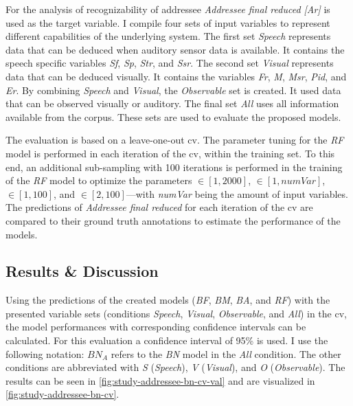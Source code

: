 For the analysis of recognizability of \gls{addressee} \emph{Addressee final reduced [Ar]} is used as the target variable.
I compile four sets of input variables to represent different capabilities of the underlying system.
The first set \emph{Speech} represents data that can be deduced when auditory sensor data is available.
It contains the speech specific variables \emph{Sf}, \emph{Sp}, \emph{Str}, and \emph{Ssr}.
The second set \emph{Visual} represents data that can be deduced visually.
It contains the variables \emph{Fr}, \emph{M}, \emph{Msr}, \emph{Pid}, and \emph{Er}.
By combining \emph{Speech} and \emph{Visual}, the \emph{Observable} set is created.
It used data that can be observed visually or auditory.
The final set \emph{All} uses all information available from the corpus.
These sets are used to evaluate the proposed models.

The evaluation is based on a leave-one-out \gls{cv}.
The parameter tuning for the \emph{RF} model is performed in each iteration of the \gls{cv}, within the training set.
To this end, an additional sub-sampling with 100 iterations is performed in the training of the \emph{RF} model to optimize the parameters  \(\in [1,2000]\),  \(\in [1,numVar]\),  \(\in [1,100]\), and  \(\in [2,100]\)---with \emph{numVar} being the amount of input variables.
The predictions of \emph{Addressee final reduced} for each iteration of the \gls{cv} are compared to their ground truth annotations to estimate the performance of the models.

\subsection{Results \& Discussion}

Using the predictions of the created models (\emph{BF}, \emph{BM}, \emph{BA}, and \emph{RF}) with the presented variable sets (conditions \emph{Speech}, \emph{Visual}, \emph{Observable}, and \emph{All}) in the \gls{cv}, the model performances with corresponding confidence intervals can be calculated.
For this evaluation a confidence interval of 95\% is used.
I use the following notation: \(BN_A\) refers to the \emph{BN} model in the \emph{All} condition.
The other conditions are abbreviated with \emph{S} (\emph{Speech}), \emph{V} (\emph{Visual}), and \emph{O} (\emph{Observable}).
The results can be seen in \cref{fig:study-addressee-bn-cv-val} and are visualized in \cref{fig:study-addressee-bn-cv}.

